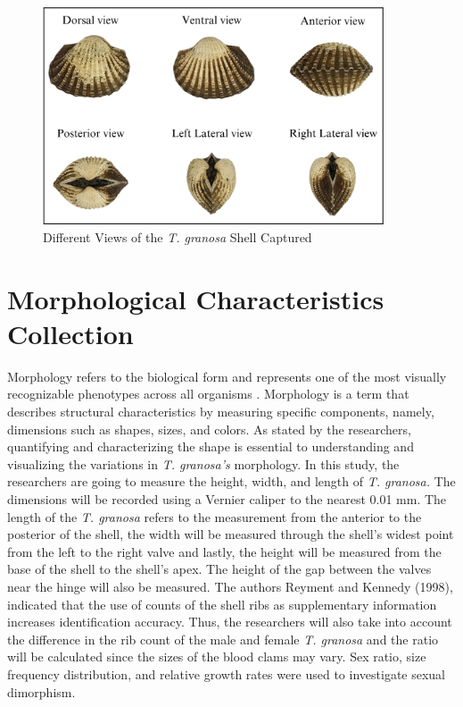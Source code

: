 \begin{figure}[!htbp]
	\centering
	\includegraphics[width=0.9\textwidth]{figures/view.png}
	\caption{Different Views of the \textit{T. granosa} Shell Captured}
\end{figure}

\section{Morphological Characteristics Collection}
\label{sec:morphochar}

Morphology refers to the biological form and represents one of the most visually recognizable phenotypes across all organisms \cite{tsutsumi2023}. Morphology is a term that describes structural characteristics by measuring specific components, namely, dimensions such as shapes, sizes, and colors. As stated by the researchers, quantifying and characterizing the shape is essential to understanding and visualizing the variations in \textit{T. granosa’s} morphology. 
In this study, the researchers are going to measure the height, width, and length of \textit{T. granosa.} The dimensions will be recorded using a Vernier caliper to the nearest 0.01 mm. The length of the \textit{T. granosa} refers to the measurement from the anterior to the posterior of the shell, the width will be measured through the shell’s widest point from the left to the right valve and lastly, the height will be measured from the base of the shell to the shell’s apex. The height of the gap between the valves near the hinge will also be measured. The authors Reyment and Kennedy (1998), indicated that the use of counts of the shell ribs as supplementary information increases identification accuracy. Thus, the researchers will also take into account the difference in the rib count of the male and female \textit{T. granosa} and the ratio will be calculated since the sizes of the blood clams may vary.
Sex ratio, size frequency distribution, and relative growth rates were used to investigate sexual dimorphism.

